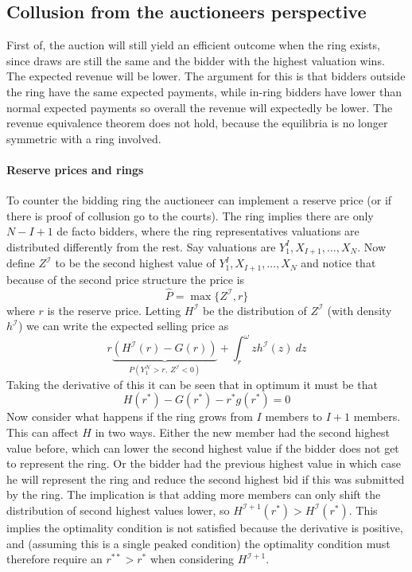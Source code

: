 \subsection{Collusion from the auctioneers perspective}
First of, the auction will still yield an efficient outcome when the ring exists, since draws are still the same and the bidder with the highest valuation wins. The expected revenue will be lower. The argument for this is that bidders outside the ring have the same expected payments, while in-ring bidders have lower than normal expected payments so overall the revenue will expectedly be lower. The revenue equivalence theorem does not hold, because the equilibria is no longer symmetric with a ring involved. 

\paragraph{Reserve prices and rings}
To counter the bidding ring the auctioneer can implement a reserve price (or if there is proof of collusion go to the courts). The ring implies there are only $N-I+1$ de facto bidders, where the ring representatives valuations are distributed differently from the rest. Say valuations are $Y_1^I, X_{I+1},...,X_N$. Now define $Z^{\mathcal{I}}$ to be the second highest value of $Y_1^I, X_{I+1},...,X_N$ and notice that because of the second price structure the price is 
\begin{equation}
    \hat{P} = \max \{Z^{\mathcal{I}}, r \}
\end{equation}
where $r$ is the reserve price. Letting $H^{\mathcal{I}}$ be the distribution of $Z^{\mathcal{I}}$ (with density $h^{\mathcal{I}}$) we can write the expected selling price as 
\begin{equation}
    r \underbrace{\left(
        H^{\mathcal{I}}(r) - G(r)
    \right)}_{P(Y_1^{\mathcal{N}} > r,\ Z^{\mathcal{I}} < 0)}
    +
    \int_r^{\omega} z h^{\mathcal{I}}(z) \ dz
\end{equation}
Taking the derivative of this it can be seen that in optimum it must be that
\begin{equation}
    H(r^*) - G(r^*) - r^* g(r^*) = 0
\end{equation}
Now consider what happens if the ring grows from $I$ members to $I+1$ members. This can affect $H$ in two ways. Either the new member had the second highest value before, which can lower the second highest value if the bidder does not get to represent the ring. 
Or the bidder had the previous highest value in which case he will represent the ring and reduce the second highest bid if this was submitted by the ring. The implication is that adding more members can only shift the distribution of second highest values lower, so $H^{\mathcal{I}+1}(r^*)>H^{\mathcal{I}}(r^*)$.
This implies the optimality condition is not satisfied because the derivative is positive, and (assuming this is a single peaked condition) the optimality condition must therefore require an $r^{**}>r^*$ when considering $H^{\mathcal{I}+1}$.

